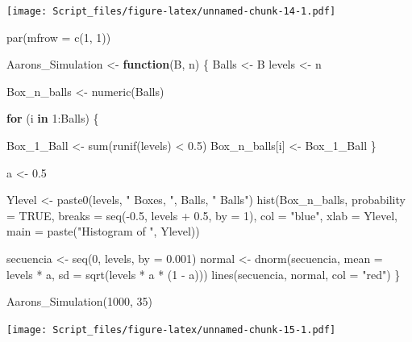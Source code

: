 \documentclass[
]{article}
\newenvironment{Shaded}{\begin{snugshade}}{\end{snugshade}}
\newcommand{\AttributeTok}[1]{\textcolor[rgb]{0.77,0.63,0.00}{#1}}
\newcommand{\ConstantTok}[1]{\textcolor[rgb]{0.00,0.00,0.00}{#1}}
\newcommand{\ControlFlowTok}[1]{\textcolor[rgb]{0.13,0.29,0.53}{\textbf{#1}}}
\newcommand{\DecValTok}[1]{\textcolor[rgb]{0.00,0.00,0.81}{#1}}
\newcommand{\FloatTok}[1]{\textcolor[rgb]{0.00,0.00,0.81}{#1}}
\newcommand{\FunctionTok}[1]{\textcolor[rgb]{0.00,0.00,0.00}{#1}}
\newcommand{\NormalTok}[1]{#1}
\newcommand{\OtherTok}[1]{\textcolor[rgb]{0.56,0.35,0.01}{#1}}
\newcommand{\SpecialCharTok}[1]{\textcolor[rgb]{0.00,0.00,0.00}{#1}}
\newcommand{\StringTok}[1]{\textcolor[rgb]{0.31,0.60,0.02}{#1}}
\begin{document}
\texttt{[image: Script\_files/figure-latex/unnamed-chunk-14-1.pdf]}

\begin{Shaded}
\begin{Highlighting}[]
\FunctionTok{par}\NormalTok{(}\AttributeTok{mfrow =} \FunctionTok{c}\NormalTok{(}\DecValTok{1}\NormalTok{, }\DecValTok{1}\NormalTok{))}
\end{Highlighting}
\end{Shaded}

\begin{Shaded}
\begin{Highlighting}[]
\NormalTok{Aarons\_Simulation }\OtherTok{\textless{}{-}} \ControlFlowTok{function}\NormalTok{(B, n) \{}
\NormalTok{  Balls }\OtherTok{\textless{}{-}}\NormalTok{ B}
\NormalTok{  levels }\OtherTok{\textless{}{-}}\NormalTok{ n}
  
  
\NormalTok{  Box\_n\_balls }\OtherTok{\textless{}{-}} \FunctionTok{numeric}\NormalTok{(Balls)}
  
  \ControlFlowTok{for}\NormalTok{ (i }\ControlFlowTok{in} \DecValTok{1}\SpecialCharTok{:}\NormalTok{Balls) \{}
  
\NormalTok{    Box\_1\_Ball }\OtherTok{\textless{}{-}} \FunctionTok{sum}\NormalTok{(}\FunctionTok{runif}\NormalTok{(levels) }\SpecialCharTok{\textless{}} \FloatTok{0.5}\NormalTok{)  }
\NormalTok{    Box\_n\_balls[i] }\OtherTok{\textless{}{-}}\NormalTok{ Box\_1\_Ball}
\NormalTok{  \}}
  
\NormalTok{  a }\OtherTok{\textless{}{-}} \FloatTok{0.5}
  
\NormalTok{  Ylevel }\OtherTok{\textless{}{-}} \FunctionTok{paste0}\NormalTok{(levels, }\StringTok{" Boxes, "}\NormalTok{, Balls, }\StringTok{" Balls"}\NormalTok{)}
  \FunctionTok{hist}\NormalTok{(Box\_n\_balls, }\AttributeTok{probability =} \ConstantTok{TRUE}\NormalTok{, }\AttributeTok{breaks =} \FunctionTok{seq}\NormalTok{(}\SpecialCharTok{{-}}\FloatTok{0.5}\NormalTok{, levels }\SpecialCharTok{+} \FloatTok{0.5}\NormalTok{, }\AttributeTok{by =} \DecValTok{1}\NormalTok{), }
       \AttributeTok{col =} \StringTok{"blue"}\NormalTok{, }
       \AttributeTok{xlab =}\NormalTok{ Ylevel, }
       \AttributeTok{main =} \FunctionTok{paste}\NormalTok{(}\StringTok{"Histogram of "}\NormalTok{, Ylevel))}
  

\NormalTok{  secuencia }\OtherTok{\textless{}{-}} \FunctionTok{seq}\NormalTok{(}\DecValTok{0}\NormalTok{, levels, }\AttributeTok{by =} \FloatTok{0.001}\NormalTok{)}
\NormalTok{  normal }\OtherTok{\textless{}{-}} \FunctionTok{dnorm}\NormalTok{(secuencia, }\AttributeTok{mean =}\NormalTok{ levels }\SpecialCharTok{*}\NormalTok{ a, }\AttributeTok{sd =} \FunctionTok{sqrt}\NormalTok{(levels }\SpecialCharTok{*}\NormalTok{ a }\SpecialCharTok{*}\NormalTok{ (}\DecValTok{1} \SpecialCharTok{{-}}\NormalTok{ a)))}
  \FunctionTok{lines}\NormalTok{(secuencia, normal, }\AttributeTok{col =} \StringTok{"red"}\NormalTok{)}
\NormalTok{\}}


\FunctionTok{Aarons\_Simulation}\NormalTok{(}\DecValTok{1000}\NormalTok{, }\DecValTok{35}\NormalTok{)}
\end{Highlighting}
\end{Shaded}

\texttt{[image: Script\_files/figure-latex/unnamed-chunk-15-1.pdf]}
\end{document}
